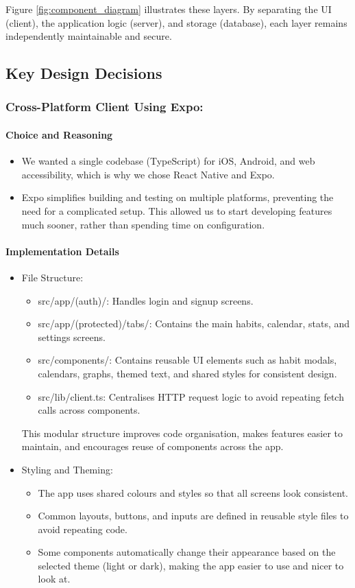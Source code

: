 Figure \ref{fig:component_diagram} illustrates these layers. By separating the UI (client), the application logic (server), and storage (database), each layer remains independently maintainable and secure.

\subsection{Key Design Decisions}

\subsubsection{Cross-Platform Client Using Expo:}

\paragraph{Choice and Reasoning} \begin{itemize} \item We wanted a single codebase (TypeScript) for iOS, Android, and web accessibility, which is why we chose React Native and Expo.
\item Expo simplifies building and testing on multiple platforms, preventing the need for a complicated setup. This allowed us to start developing features much sooner, rather than spending time on configuration.  \end{itemize}

\paragraph{Implementation Details} \begin{itemize} \item {File Structure}:
\begin{itemize} \item {src/app/(auth)/}: Handles login and signup screens.
\item{src/app/(protected)/tabs/}: Contains the main habits, calendar, stats, and settings screens.
\item{src/components/}: Contains reusable UI elements such as habit modals, calendars, graphs, themed text, and shared styles for consistent design.
\item {src/lib/client.ts}: Centralises HTTP request logic to avoid repeating fetch calls across components. \end{itemize} 
This modular structure improves code organisation, makes features easier to maintain, and encourages reuse of components across the app.
\item {Styling and Theming}:
\begin{itemize} 
\item The app uses shared colours and styles so that all screens look consistent.
\item Common layouts, buttons, and inputs are defined in reusable style files to avoid repeating code.
\item Some components automatically change their appearance based on the selected theme (light or dark), making the app easier to use and nicer to look at. \end{itemize} \end{itemize}


